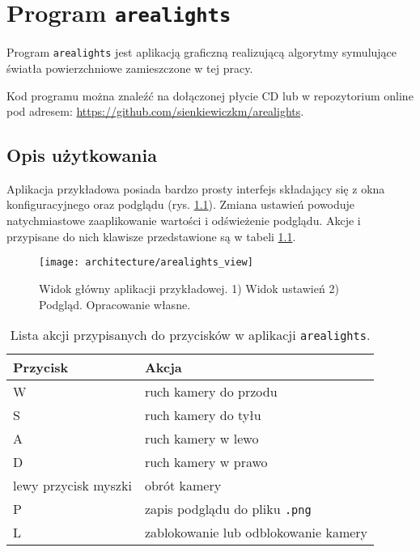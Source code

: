 \documentclass[../main.tex]{subfiles}
\begin{document}
\chapter{Program \texttt{arealights}}

Program \texttt{arealights} jest aplikacją graficzną realizującą algorytmy symulujące światła powierzchniowe zamieszczone w tej pracy.

Kod programu można znaleźć na dołączonej płycie CD lub w repozytorium online pod adresem: \url{https://github.com/sienkiewiczkm/arealights}.

\section{Opis użytkowania}

Aplikacja przykładowa posiada bardzo prosty interfejs składający się z okna konfiguracyjnego oraz podglądu (rys. \ref{fig:app_arealights_view}). Zmiana ustawień powoduje natychmiastowe zaaplikowanie wartości i odświeżenie podglądu. Akcje i przypisane do nich klawisze przedstawione są w tabeli \ref{tab:arealights_keybindings}.

\begin{figure}[h]
    \centering
    \texttt{[image: architecture/arealights\_view]}
    \caption{Widok główny aplikacji przykładowej. 1) Widok ustawień 2) Podgląd. Opracowanie własne.}
    \label{fig:app_arealights_view}
\end{figure}

\begin{table}[h]
    \centering
    \begin{tabular}{|l|l|}
        \hline \textbf{Przycisk} & \textbf{Akcja} \\ \hline
        W & ruch kamery do przodu \\ \hline
        S & ruch kamery do tyłu \\ \hline
        A & ruch kamery w lewo \\ \hline
        D & ruch kamery w prawo \\ \hline
        lewy przycisk myszki & obrót kamery \\ \hline
        P & zapis podglądu do pliku \texttt{.png} \\ \hline
        L & zablokowanie lub odblokowanie kamery \\ \hline
    \end{tabular}
    
    \caption{Lista akcji przypisanych do przycisków w aplikacji \texttt{arealights}.}
    \label{tab:arealights_keybindings}
\end{table}
\end{document}
